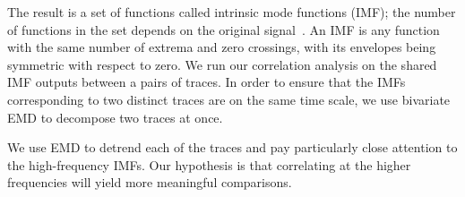 The result is a set of functions called intrinsic mode functions (IMF); the number of functions in 
the set depends on the original signal~\cite{emd_process}.  An IMF is any 
function with the same number of extrema and zero crossings, with its envelopes being symmetric with respect to zero.
We run our correlation analysis on the shared IMF outputs between a pairs of traces.  In order to ensure 
that the IMFs corresponding to two distinct traces are on the same time scale, we use 
bivariate EMD \cite{rilling:biemd2007} to decompose two traces at once.

We use EMD to detrend each of the traces and pay particularly close attention to the high-frequency IMFs.  Our 
hypothesis is that correlating at the higher frequencies will yield more meaningful comparisons.
